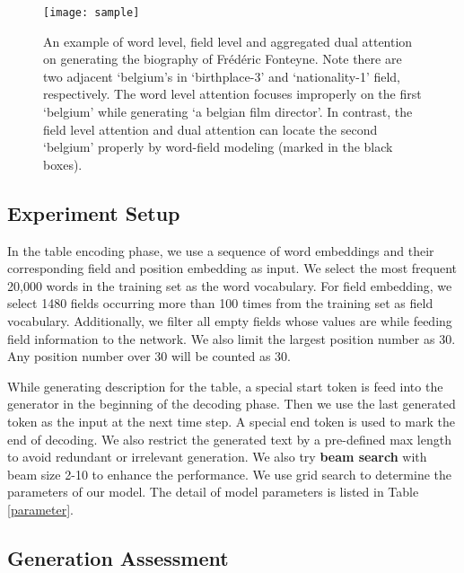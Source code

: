 \documentclass[letterpaper]{article} \usepackage{aaai18}  \usepackage{times}  \usepackage{helvet}  \usepackage{courier}  \usepackage{url}  \usepackage{graphicx}  \frenchspacing  \setlength{\pdfpagewidth}{8.5in}  \setlength{\pdfpageheight}{11in}  \usepackage{amsmath}
\begin{document}
\begin{figure*}[ht]
\centering
\texttt{[image: sample]}
\caption{An example of word level, field level and aggregated dual attention on generating the biography of Fr\'ed\'eric Fonteyne. Note there are two adjacent `belgium's in `birthplace-3' and  `nationality-1' field, respectively. The word level attention focuses improperly on the first `belgium' while generating `a belgian film director'. In contrast, the field level attention and dual attention can locate the second `belgium' properly by word-field modeling (marked in the black boxes).}\label{attshow}
\end{figure*}



\subsection{Experiment Setup}
In the table encoding phase, we use a sequence of word embeddings and their corresponding field and position embedding as input.
We select the most frequent 20,000 words in the training set as the word vocabulary. 
For field embedding, we select 1480 fields occurring more than 100 times from the training set as field vocabulary. Additionally, we filter all empty fields whose values are \textit{} while feeding field information to the network. 
We also limit the largest position number as 30. Any position number over 30 will be counted as 30.   

While generating description for the table, a special start token \textit{} is feed into the generator in the beginning of the decoding phase. Then we use the last generated token as the input at the next time step.
A special end token \textit{} is used to mark the end of decoding. We also restrict the generated text by a pre-defined max length to avoid redundant or irrelevant generation.
We also try \textbf{beam search} with beam size 2-10 to enhance the performance. 
We use grid search to determine the parameters of our model. The detail of model parameters is listed in Table \ref{parameter}.   


\subsection{Generation Assessment}
\end{document}

